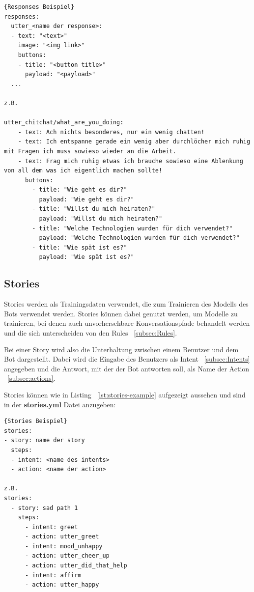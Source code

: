 \begin{lstlisting}[label={lst:responses-example},caption={Responses Beispiel}]{Responses Beispiel}
responses:
  utter_<name der response>:
  - text: "<text>"
    image: "<img link>"
    buttons:
    - title: "<button title>"
      payload: "<payload>"
  ...

z.B.

utter_chitchat/what_are_you_doing:
    - text: Ach nichts besonderes, nur ein wenig chatten!
    - text: Ich entspanne gerade ein wenig aber durchlöcher mich ruhig mit Fragen ich muss sowieso wieder an die Arbeit.
    - text: Frag mich ruhig etwas ich brauche sowieso eine Ablenkung von all dem was ich eigentlich machen sollte!
      buttons:
        - title: "Wie geht es dir?"
          payload: "Wie geht es dir?"
        - title: "Willst du mich heiraten?"
          payload: "Willst du mich heiraten?"
        - title: "Welche Technologien wurden für dich verwendet?"
          payload: "Welche Technologien wurden für dich verwendet?"
        - title: "Wie spät ist es?"
          payload: "Wie spät ist es?"
\end{lstlisting}

\subsection{Stories}\label{subsec:Stories}

Stories werden als Trainingsdaten verwendet, die zum Trainieren des Modells des Bots verwendet werden.
Stories können dabei genutzt werden, um Modelle zu trainieren, bei denen auch unvorhersehbare Konversationspfade behandelt werden und die sich unterscheiden von den Rules ~\ref{subsec:Rules}.\cite{stories}

Bei einer Story wird also die Unterhaltung zwischen einem Benutzer und dem Bot dargestellt.
Dabei wird die Eingabe des Benutzers als Intent ~\ref{subsec:Intents} angegeben und die Antwort, mit der der Bot antworten soll, als Name der Action ~\ref{subsec:actions}.\cite{stories}

Stories können wie in Listing ~\ref{lst:stories-example} aufgezeigt aussehen und sind in der \textbf{stories.yml} Datei anzugeben:

\begin{lstlisting}[label={lst:stories-example},caption={Stories Beispiel}]{Stories Beispiel}
stories:
- story: name der story
  steps:
  - intent: <name des intents>
  - action: <name der action>

z.B.
stories:
  - story: sad path 1
    steps:
      - intent: greet
      - action: utter_greet
      - intent: mood_unhappy
      - action: utter_cheer_up
      - action: utter_did_that_help
      - intent: affirm
      - action: utter_happy
\end{lstlisting}

